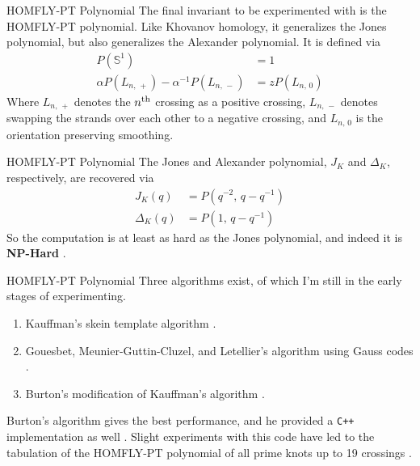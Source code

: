 \documentclass{beamer}
\begin{document}
    \begin{frame}{HOMFLY-PT Polynomial}
        The final invariant to be experimented with is the HOMFLY-PT
        polynomial. Like Khovanov homology, it generalizes the Jones polynomial,
        but also generalizes the Alexander polynomial. It is defined via
        \begin{align}
            P(\mathbb{S}^{1})&=1\\
            \alpha{P}(L_{n,\,+})-\alpha^{-1}P(L_{n,\,-})
            &=zP(L_{n,\,0})
        \end{align}
        Where $L_{n,\,+}$ denotes the $n^{\small\textrm{th}}$ crossing as a
        positive crossing, $L_{n,\,-}$ denotes swapping the strands over each
        other to a negative crossing, and $L_{n,\,0}$ is the
        orientation preserving smoothing.
    \end{frame}
    \begin{frame}{HOMFLY-PT Polynomial}
        The Jones and Alexander polynomial, $J_{K}$ and $\Delta_{K}$,
        respectively, are recovered via
        \begin{align}
            J_{K}(q)&=P(q^{-2},\,q-q^{-1})\\
            \Delta_{K}(q)&=P(1,\,q-q^{-1})
        \end{align}
        So the computation is at least as hard as the Jones polynomial, and
        indeed it is \textbf{NP-Hard} \cite{HOMFLYPTNPHard}.
    \end{frame}
    \begin{frame}{HOMFLY-PT Polynomial}
        Three algorithms exist, of which I'm still in the early stages of
        experimenting.
        \begin{enumerate}
            \item Kauffman's skein template algorithm \cite{KauffmanStateModelsLinkPolynomials}.
            \item Gouesbet, Meunier-Guttin-Cluzel, and Letellier's algorithm using Gauss codes \cite{GOUESBET1999271}.
            \item Burton's modification of Kauffman's algorithm \cite{Burton2018HOMFLFixedParameter}.
        \end{enumerate}
        Burton's algorithm gives the best performance, and he provided a
        \texttt{C++} implementation as well \cite{regina}. Slight experiments
        with this code have led to the tabulation of the HOMFLY-PT polynomial
        of all prime knots up to 19 crossings
        \cite{HOMFLYData}.
    \end{frame}
\end{document}
